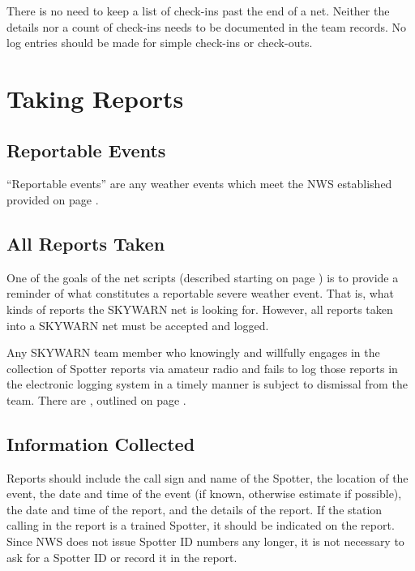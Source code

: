 \documentclass[pdflatex,letterpaper,twoside,12pt]{book}
\begin{document}
There is no need to keep a list of check-ins past the end of a net. Neither the details nor a count of check-ins needs to be documented in the team records.  No log entries should be made for simple check-ins or check-outs.


\section{Taking Reports}

\subsection{Reportable Events}

``Reportable events'' are any weather events which meet the NWS established  provided on page \pageref{reporting-criteria}.

\subsection{All Reports Taken}

One of the goals of the net scripts (described starting on page \pageref{scripts}) is to provide a reminder of what constitutes a reportable severe weather event.  That is, what kinds of reports the SKYWARN net is looking for.  However, all reports taken into a SKYWARN net must be accepted and logged.

Any SKYWARN team member who knowingly and willfully engages in the collection of Spotter reports via amateur radio and fails to log those reports in the electronic logging system in a timely manner is subject to dismissal from the team.  There are , outlined on page \pageref{two-exceptions}.

\subsection{Information Collected}

Reports should include the call sign and name of the Spotter, the location of the event, the date and time of the event (if known, otherwise estimate if possible), the date and time of the report, and the details of the report.  If the station calling in the report is a trained Spotter, it should be indicated on the report.  Since NWS does not issue Spotter ID numbers any longer, it is not necessary to ask for a Spotter ID or record it in the report.
\end{document}

